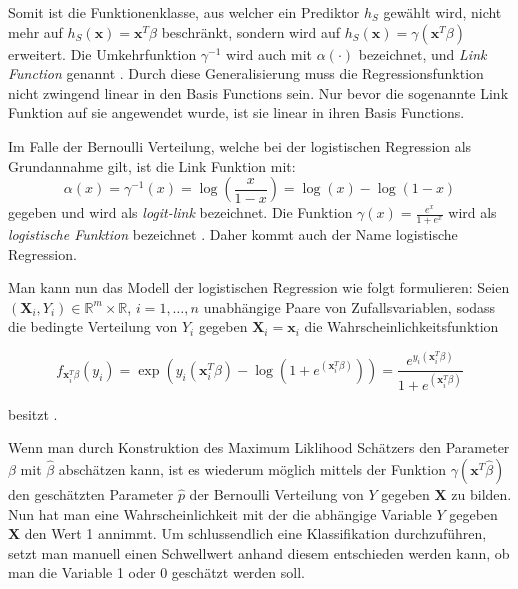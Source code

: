 Somit ist die Funktionenklasse, aus welcher ein Prediktor $h_S$ gew\"ahlt wird, nicht mehr auf $h_S(\mathbf{x}) = \mathbf{x}^T\beta$ beschr\"ankt,
sondern wird auf  $h_S(\mathbf{x}) = \gamma(\mathbf{x}^T\beta)$ erweitert. Die Umkehrfunktion $\gamma^{-1}$ wird auch mit $\alpha(\cdot)$ bezeichnet,
und \textit{Link Function} genannt \cite[Seite 180]{bishop}. Durch diese Generalisierung muss die Regressionsfunktion nicht zwingend linear in den Basis Functions sein.
Nur bevor die sogenannte Link Funktion auf sie angewendet wurde, ist sie linear in ihren Basis Functions.

Im Falle der Bernoulli Verteilung, welche bei der logistischen Regression als Grundannahme gilt, ist die Link Funktion mit:
$$ \alpha(x) = \gamma^{-1}(x) = \log(\frac{x}{1-x}) = \log(x) - \log(1-x) $$
gegeben und wird als \textit{logit-link} bezeichnet. Die Funktion $\gamma(x) = \frac{e^x}{1 + e^x}$ wird als \textit{logistische Funktion} bezeichnet \cite[Seite 223]{wasserman}.
Daher kommt auch der Name \glqq logistische Regression\grqq{}.


Man kann nun das Modell der logistischen Regression wie folgt formulieren:
Seien $(\mathbf{X}_i, Y_i) \in \mathbb{R}^m \times \mathbb{R}$, $i = 1, \dots , n$  unabh\"angige Paare von Zufallsvariablen, sodass die bedingte Verteilung von
$Y_i$ gegeben $\mathbf{X}_i = \mathbf{x}_i$ die Wahrscheinlichkeitsfunktion

$$ f_{\mathbf{x}_i^T\beta}(y_i) = \exp( y_i(\mathbf{x}_i^T\beta) - \log(1 + e^{(\mathbf{x}_i^T\beta)})) = \frac{e^{y_i(\mathbf{x}_i^T\beta)}}{1 + e^{(\mathbf{x}_i^T\beta)}}$$

besitzt \cite[Seite 223]{wasserman}. %

Wenn man durch Konstruktion des Maximum Liklihood Sch\"atzers den Parameter $\beta$ mit $\hat{\beta}$ absch\"atzen kann, ist es wiederum m\"oglich mittels der Funktion $\gamma(\mathbf{x}^T\hat{\beta})$
den gesch\"atzten Parameter $\hat{p}$ der Bernoulli Verteilung von $Y$ gegeben $\mathbf{X}$ zu bilden. Nun hat man eine Wahrscheinlichkeit mit der die abh\"angige Variable $Y$ gegeben $\mathbf{X}$ den Wert 1 annimmt.
Um schlussendlich eine Klassifikation durchzuf\"uhren, setzt man manuell einen Schwellwert anhand diesem entschieden werden kann, ob man die Variable 1 oder 0 gesch\"atzt werden soll.
























